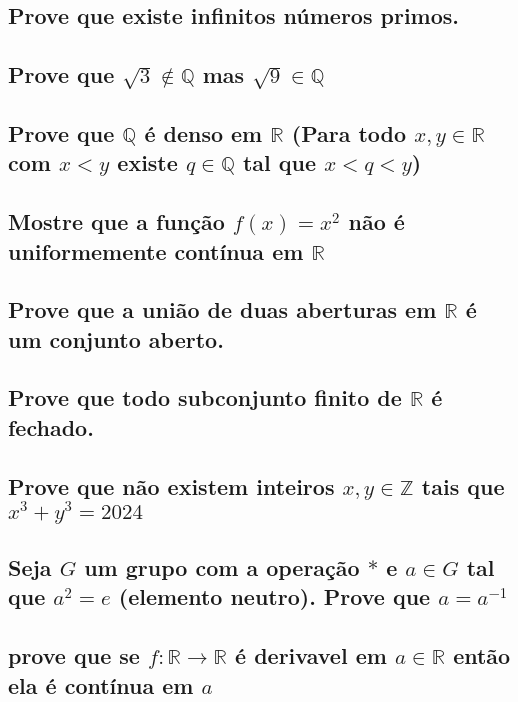 \documentclass{article}
\begin{document}
\subsection{Prove que existe infinitos números primos.}

\subsection{Prove que $\sqrt{3} \notin \mathbb{Q}$ mas $\sqrt{9} \in \mathbb{Q}$}

\subsection{Prove que $\mathbb{Q}$ é denso em $\mathbb{R}$ (Para todo $x, y \in \mathbb{R}$ com $x \lt y$ existe $q \in \mathbb{Q}$ tal que $x \lt q \lt y$)}

\subsection{Mostre que a função $f(x) = x^2$ não é uniformemente contínua em $\mathbb{R}$}

\subsection{Prove que a união de duas aberturas em $\mathbb{R}$ é um conjunto aberto.}

\subsection{Prove que todo subconjunto finito de $\mathbb{R}$ é fechado.}

\subsection{Prove que não existem inteiros $x, y \in \mathbb{Z}$ tais que $x^3 + y^3 = 2024$}

\subsection{Seja $G$ um grupo com a operação $*$ e $a \in G$ tal que $a^2 = e$ (elemento neutro). Prove que $a = a^{-1}$}

\subsection{prove que se $f: \mathbb{R} \to \mathbb{R}$ é derivavel em $a \in \mathbb{R}$ então ela é contínua em $a$}
\end{document}
